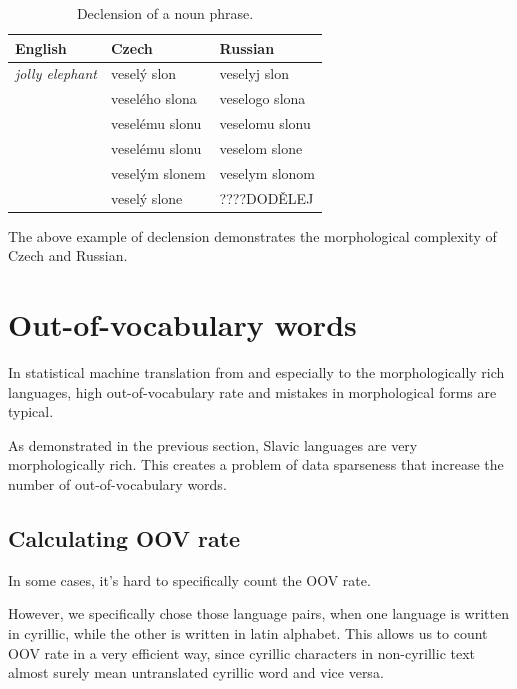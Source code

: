 \documentclass[11pt,letterpaper]{article}
\begin{document}
\begin{table}
\begin{center}
\begin{tabular}{|l|l|l|}
\hline
English & Czech & Russian \\ \hline
\textit{jolly elephant} & veselý slon & veselyj slon \\
 & veselého slona & veselogo slona \\
 & veselému slonu & veselomu slonu \\
 & veselému slonu & veselom slone\\
 & veselým slonem& veselym slonom\\
 & veselý slone & ????DODĚLEJ\\
\hline
\end{tabular}
\end{center}
\caption{Declension of a noun phrase.}
\label{tab:slon}
\end{table}

The above example of declension demonstrates the morphological complexity of Czech and Russian.

\section{Out-of-vocabulary words}
In statistical machine translation from and especially to the morphologically rich languages,
high out-of-vocabulary rate and mistakes in morphological forms are typical.

As demonstrated in the previous section, Slavic languages are very morphologically rich. This creates a problem of data sparseness that increase the number of out-of-vocabulary words.

\subsection{Calculating OOV rate}
In some cases, it's hard to specifically count the OOV rate.

However, we specifically chose those language pairs, when one language is written in cyrillic, while the other is written in latin alphabet. This allows us to count OOV rate in a very efficient way, since cyrillic characters in non-cyrillic text almost surely mean untranslated cyrillic word and vice versa.
\end{document}
